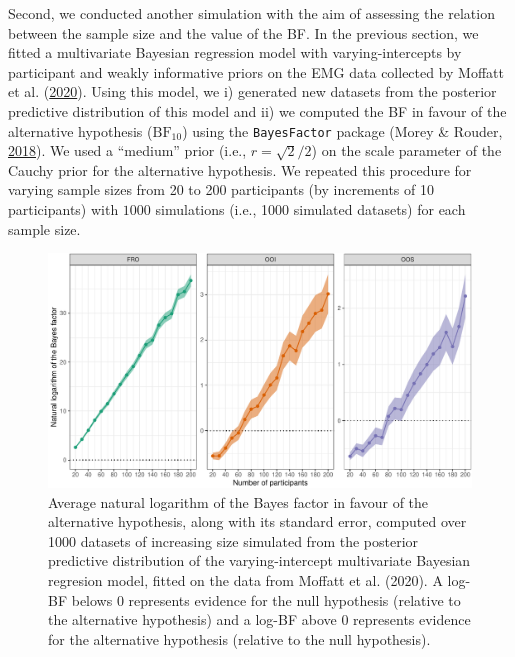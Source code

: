 \documentclass[
  english,
  man, donotrepeattitle,floatsintext]{apa6}
\begin{document}
Second, we conducted another simulation with the aim of assessing the relation between the sample size and the value of the BF. In the previous section, we fitted a multivariate Bayesian regression model with varying-intercepts by participant and weakly informative priors on the EMG data collected by Moffatt et al. (\protect\hyperlink{ref-moffatt_inner_2020}{2020}). Using this model, we i) generated new datasets from the posterior predictive distribution of this model and ii) we computed the BF in favour of the alternative hypothesis (\(\text{BF}_{10}\)) using the \texttt{BayesFactor} package (Morey \& Rouder, \protect\hyperlink{ref-R-BayesFactor}{2018}). We used a ``medium'' prior (i.e., \(r = \sqrt{2}/2\)) on the scale parameter of the Cauchy prior for the alternative hypothesis. We repeated this procedure for varying sample sizes from 20 to 200 participants (by increments of 10 participants) with \(1000\) simulations (i.e., 1000 simulated datasets) for each sample size.

\begin{figure}[!htb]

{\centering \includegraphics[width=1\linewidth]{manuscript_files/figure-latex/simulated-power-1} 

}

\caption{Average natural logarithm of the Bayes factor in favour of the alternative hypothesis, along with its standard error, computed over 1000 datasets of increasing size simulated from the posterior predictive distribution of the varying-intercept multivariate Bayesian regresion model, fitted on the data from Moffatt et al. (2020). A log-BF belows 0 represents evidence for the null hypothesis (relative to the alternative hypothesis) and a log-BF above 0 represents evidence for the alternative hypothesis (relative to the null hypothesis).}\label{fig:simulated-power}
\end{figure}
\end{document}
